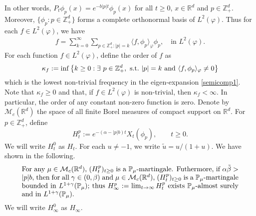 \documentclass[12pt,a4paper]{amsart}
\theoremstyle{plain}
\theoremstyle{definition}
\numberwithin{equation}{section}
\begin{document}
In other words,
\(
  P_t\phi_p(x)
  = e^{-b|p|t}\phi_p(x)
\)
for all $t\geq 0$, $x\in \mathbb R^d$ and $p\in \mathbb Z_+^d$.
Moreover, $\{\phi_p: p \in \mathbb Z_+^d\}$ forms a complete orthonormal basis of $L^2(\varphi)$.
Thus for each $f\in L^2(\varphi)$, we have
\begin{align}
  \label{semicomp1}
  f
  = \sum_{k=0}^{\infty}\sum_{p\in \mathbb Z_+^d:|p|=k}\langle f, \phi_p \rangle_{\varphi} \phi_p
  , \quad \text{in~} L^2(\varphi).
\end{align}
For each function $f\in L^2(\varphi)$, define the order of $f$ as
\[
  \kappa_f
  := \inf \left \{k\geq 0: \exists ~ p\in \mathbb Z_+^d , {\rm ~s.t.~} |p|=k {\rm ~and~}  \langle f, \phi_p \rangle_{\varphi}\neq 0\right \}
\]
which is the lowest non-trivial frequency in the eigen-expansion \eqref{semicomp1}.
Note that $ \kappa_f\geq 0$ and that, if $f\in L^2(\varphi)$ is non-trivial, then $\kappa_f<\infty$.
In particular, the order of any constant non-zero function is zero.
Denote by $\mathcal M_c(\mathbb R^d)$ the space of all finite Borel measures of compact support on $\mathbb R^d$.
For $p\in \mathbb{Z}_+^d$, define
\[
  H_t^p
  := e^{-(\alpha-|p|b)t}X_t(\phi_p), \qquad t\geq 0.
\]
We will write $H^0_t$ as $H_t$.
For each $u \neq -1$, we write $\tilde u = u/(1+ u)$.
We have shown in \cite[Lemma 3.2]{RenSongSunZhao2019Stable} the following. 
\begin{equation}\label{eq:Hinfty}
\begin{minipage}{0.9\textwidth}
	For any $\mu\in \mathcal M_c(\mathbb R^d)$, $(H_t^p)_{t\geq 0}$ is a $\mathbb{P}_{\mu}$-martingale.
	Futhermore, if $\alpha \tilde \beta>|p|b$, then for all $\gamma\in (0, \beta)$ and $\mu\in \mathcal M_c(\mathbb R^d)$,  $(H_t^p)_{t\geq 0}$ is a $\mathbb{P}_{\mu}$-martingale bounded in $L^{1+\gamma}(\mathbb{P}_{\mu})$;
	thus $H^p_{\infty}:=\lim_{t\rightarrow \infty}H_t^p$ exists $\mathbb{P}_{\mu}$-almost surely and in $L^{1+\gamma}(\mathbb P_\mu)$.
\end{minipage}
\end{equation}
We will write $H^0_\infty$ as $H_\infty$.
\end{document}
